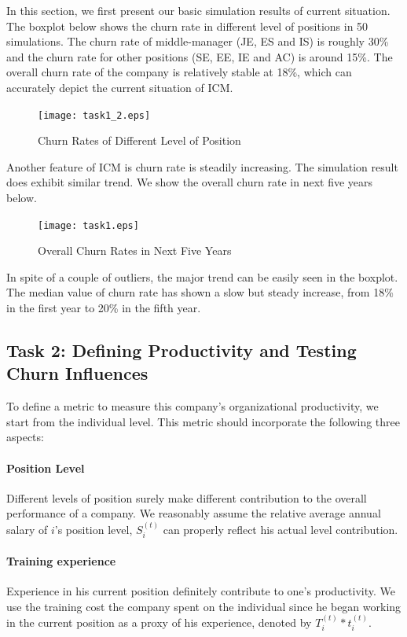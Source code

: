\documentclass[tcn = 37075, sheet = false, abstract = false]{mcmthesis}
\begin{document}
In this section, we first present our basic simulation results of current situation. The boxplot below shows the churn rate in different level of positions in 50 simulations. The churn rate of middle-manager (JE, ES and IS) is roughly 30\% and the churn rate for other positions (SE, EE, IE and AC) is around 15\%. The overall churn rate of the company is relatively stable at 18\%, which can accurately depict the current situation of ICM.

\begin{figure}[htb!]
\texttt{[image: task1\_2.eps]}
\caption{Churn Rates of Different Level of Position} 
\label{fig:2}
\end{figure}

Another feature of ICM is churn rate is steadily increasing. The simulation result does exhibit similar trend. We show the overall churn rate in next five years below.

\begin{figure}[htb!]
\centering
\texttt{[image: task1.eps]}
\caption{Overall Churn Rates in Next Five Years} 
\label{fig:2}
\end{figure}

In spite of a couple of outliers, the major trend can be easily seen in the boxplot. The median value of churn rate has shown a slow but steady increase, from 18\% in the first year to 20\% in the fifth year.

\subsection{Task 2: Defining Productivity and Testing Churn Influences}

To define a metric to measure this company's organizational productivity, we start from the individual level. This metric should incorporate the following three aspects:

\paragraph{Position Level}
Different levels of position surely make different contribution to the overall performance of a company. We reasonably assume the relative average annual salary of $i$'s position level, $S_i^{(t)}$ can properly reflect his actual level contribution.

\paragraph{Training experience}
Experience in his current position definitely contribute to one's productivity. We use the training cost the company spent on the individual since he began working in the current position as a proxy of his experience, denoted by $T_i^{(t)}*t_i^{(t)}$.
\end{document}
